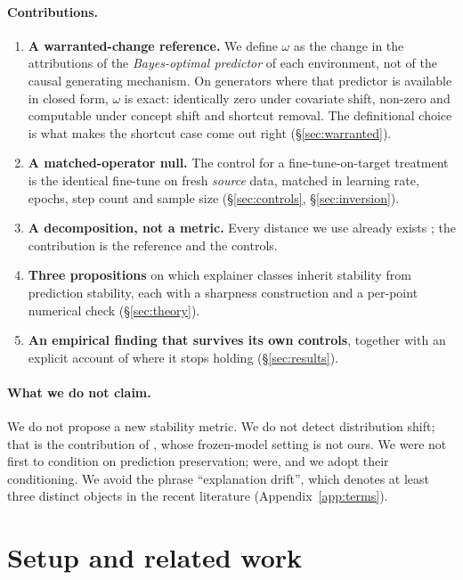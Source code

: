 \documentclass{article}
\begin{document}
\paragraph{Contributions.}
\begin{enumerate}\itemsep2pt
\item \textbf{A warranted-change reference.} We define $\omega$ as the change in the attributions of
the \emph{Bayes-optimal predictor} of each environment, not of the causal generating
mechanism. On generators where that predictor is available in closed form, $\omega$ is exact:
identically zero under covariate shift, non-zero and computable under concept shift and shortcut
removal. The definitional choice is what makes the shortcut case come out right (\S\ref{sec:warranted}).
\item \textbf{A matched-operator null.} The control for a fine-tune-on-target treatment is the
identical fine-tune on fresh \emph{source} data, matched in learning rate, epochs, step count and
sample size (\S\ref{sec:controls}, \S\ref{sec:inversion}).
\item \textbf{A decomposition, not a metric.} Every distance we use already exists
\citep{alvarez2018,yeh2019,bhatt2020,agarwal2022ros,openxai2022,quantus2023}; the contribution is
the reference and the controls.
\item \textbf{Three propositions} on which explainer classes inherit stability from prediction
stability, each with a sharpness construction and a per-point numerical check (\S\ref{sec:theory}).
\item \textbf{An empirical finding that survives its own controls}, together with an explicit account
of where it stops holding (\S\ref{sec:results}).
\end{enumerate}

\paragraph{What we do not claim.} We do not propose a new stability metric. We do not detect
distribution shift; that is the contribution of \citet{mougan2025}, whose frozen-model setting is not
ours. We were not first to condition on prediction preservation; \citet{fass2026} were, and we adopt
their conditioning. We avoid the phrase ``explanation drift'', which denotes at least three distinct
objects in the recent literature (Appendix~\ref{app:terms}).

\section{Setup and related work}
\end{document}
